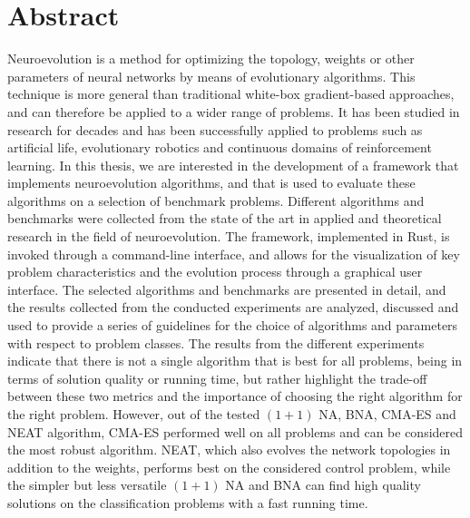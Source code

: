 \section*{Abstract}

Neuroevolution is a method for optimizing the topology, weights or other parameters of neural networks by means of evolutionary algorithms.
This technique is more general than traditional white-box gradient-based approaches, and can therefore be applied to a wider range of
problems. It has been studied in research for decades and has been successfully applied to problems such as artificial life,
evolutionary robotics and continuous domains of reinforcement learning.
In this thesis, we are interested in the development of a framework that implements neuroevolution algorithms, and that is used to evaluate these algorithms on a
selection of benchmark problems. Different algorithms and benchmarks were collected from the state of the art in applied and theoretical research in
the field of neuroevolution. The framework, implemented in Rust, is invoked through a command-line interface, and allows for the visualization of key problem
characteristics and the evolution process through a graphical user interface. The selected algorithms and benchmarks are presented in detail, and the results collected
from the conducted experiments are analyzed, discussed and used to provide a series of guidelines for the choice of algorithms and parameters with respect
to problem classes.
The results from the different experiments indicate that there is not a single algorithm that is best for all problems, being in terms of solution quality or
running time, but rather highlight the trade-off between these two metrics and the importance of choosing the right algorithm for the right problem.
However, out of the tested $(1 + 1)$ NA, BNA, CMA-ES and NEAT algorithm, CMA-ES performed well on all problems and can be considered the most robust algorithm.
NEAT, which also evolves the network topologies in addition to the weights, performs best on the considered control problem, while the simpler but less versatile
$(1 + 1)$ NA and BNA can find high quality solutions on the classification problems with a fast running time.
